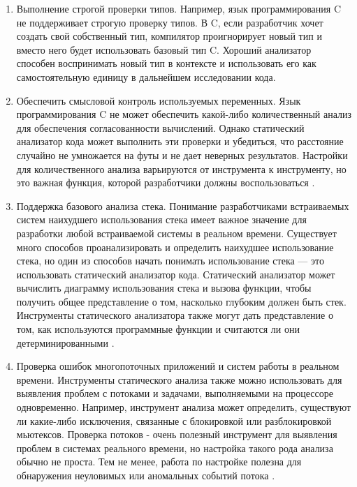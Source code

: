 \begin{enumerate}
    \item Выполнение строгой проверки типов.  Например, язык программирования C не поддерживает строгую проверку типов. В C, если разработчик хочет создать свой собственный тип, компилятор проигнорирует новый тип и вместо него будет использовать базовый тип C. Хороший анализатор способен воспринимать новый тип в контексте и использовать его как самостоятельную единицу в дальнейшем исследовании кода.
    
    \item Обеспечить смысловой контроль используемых переменных. Язык программирования C не может обеспечить какой-либо количественный анализ для обеспечения согласованности вычислений. Однако статический анализатор кода может выполнить эти проверки и убедиться, что расстояние случайно не умножается на футы и не дает неверных результатов. Настройки для количественного анализа варьируются от инструмента к инструменту, но это важная функция, которой разработчики должны воспользоваться \cite{7}.
    
    \item Поддержка базового анализа стека. Понимание разработчиками встраиваемых систем наихудшего использования стека имеет важное значение для разработки любой встраиваемой системы в реальном времени. Существует много способов проанализировать и определить наихудшее использование стека, но один из способов начать понимать использование стека — это использовать статический анализатор кода. Статический анализатор может вычислить диаграмму использования стека и вызова функции, чтобы получить общее представление о том, насколько глубоким должен быть стек. Инструменты статического анализатора также могут дать представление о том, как используются программные функции и считаются ли они детерминированными \cite{12}.
    
    \item Проверка ошибок многопоточных приложений и систем работы в реальном времени. Инструменты статического анализа также можно использовать для выявления проблем с потоками и задачами, выполняемыми на процессоре одновременно. Например, инструмент анализа может определить, существуют ли какие-либо исключения, связанные с блокировкой или разблокировкой мьютексов. Проверка потоков - очень полезный инструмент для выявления проблем в системах реального времени, но настройка такого рода анализа обычно не проста. Тем не менее, работа по настройке полезна для обнаружения неуловимых или аномальных событий потока \cite{13}.
    
\end{enumerate}



